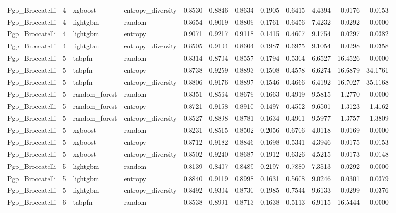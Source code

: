 \begin{tabular}{lrllrrrrrrrr}
Pgp_Broccatelli & 4 & xgboost & entropy_diversity & 0.8530 & 0.8846 & 0.8634 & 0.1905 & 0.6415 & 4.4394 & 0.0176 & 0.0153 \\
Pgp_Broccatelli & 4 & lightgbm & random & 0.8654 & 0.9019 & 0.8809 & 0.1761 & 0.6456 & 7.4232 & 0.0292 & 0.0000 \\
Pgp_Broccatelli & 4 & lightgbm & entropy & 0.9071 & 0.9217 & 0.9118 & 0.1415 & 0.4607 & 9.1754 & 0.0297 & 0.0382 \\
Pgp_Broccatelli & 4 & lightgbm & entropy_diversity & 0.8505 & 0.9104 & 0.8604 & 0.1987 & 0.6975 & 9.1054 & 0.0298 & 0.0358 \\
Pgp_Broccatelli & 5 & tabpfn & random & 0.8314 & 0.8704 & 0.8557 & 0.1794 & 0.5304 & 6.6527 & 16.4526 & 0.0000 \\
Pgp_Broccatelli & 5 & tabpfn & entropy & 0.8738 & 0.9259 & 0.8893 & 0.1508 & 0.4578 & 6.6274 & 16.6879 & 34.1761 \\
Pgp_Broccatelli & 5 & tabpfn & entropy_diversity & 0.8806 & 0.9176 & 0.8897 & 0.1546 & 0.4666 & 6.4192 & 16.7027 & 35.1168 \\
Pgp_Broccatelli & 5 & random_forest & random & 0.8351 & 0.8564 & 0.8679 & 0.1663 & 0.4919 & 9.5815 & 1.2770 & 0.0000 \\
Pgp_Broccatelli & 5 & random_forest & entropy & 0.8721 & 0.9158 & 0.8910 & 0.1497 & 0.4552 & 9.6501 & 1.3123 & 1.4162 \\
Pgp_Broccatelli & 5 & random_forest & entropy_diversity & 0.8527 & 0.8898 & 0.8781 & 0.1634 & 0.4901 & 9.5977 & 1.3757 & 1.3809 \\
Pgp_Broccatelli & 5 & xgboost & random & 0.8231 & 0.8515 & 0.8502 & 0.2056 & 0.6706 & 4.0118 & 0.0169 & 0.0000 \\
Pgp_Broccatelli & 5 & xgboost & entropy & 0.8712 & 0.9182 & 0.8846 & 0.1698 & 0.5341 & 4.3946 & 0.0175 & 0.0153 \\
Pgp_Broccatelli & 5 & xgboost & entropy_diversity & 0.8502 & 0.9240 & 0.8687 & 0.1912 & 0.6326 & 4.5215 & 0.0173 & 0.0148 \\
Pgp_Broccatelli & 5 & lightgbm & random & 0.8139 & 0.8407 & 0.8489 & 0.2197 & 0.7880 & 7.3513 & 0.0292 & 0.0000 \\
Pgp_Broccatelli & 5 & lightgbm & entropy & 0.8840 & 0.9119 & 0.8998 & 0.1631 & 0.5608 & 9.0246 & 0.0301 & 0.0379 \\
Pgp_Broccatelli & 5 & lightgbm & entropy_diversity & 0.8492 & 0.9304 & 0.8730 & 0.1985 & 0.7544 & 9.6133 & 0.0299 & 0.0376 \\
Pgp_Broccatelli & 6 & tabpfn & random & 0.8538 & 0.8991 & 0.8713 & 0.1638 & 0.5113 & 6.9115 & 16.5444 & 0.0000 \\

\end{tabular}
